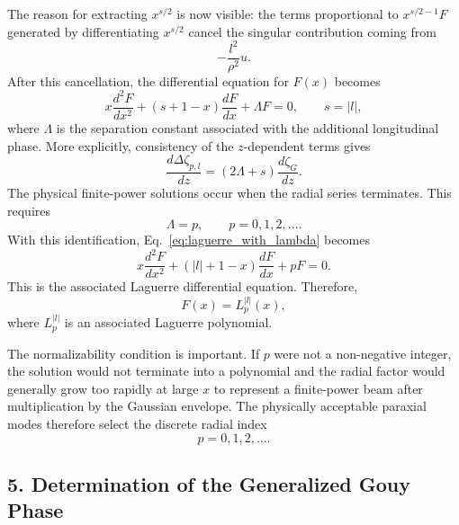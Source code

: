 \begin{resolucao}[Solution]
    The reason for extracting $x^{s/2}$ is now visible: the terms proportional to $x^{s/2-1}F$ generated by differentiating $x^{s/2}$ cancel the singular contribution coming from
    \[
        -\frac{l^2}{\rho^2}u.
    \]
    After this cancellation, the differential equation for $F(x)$ becomes
    \begin{equation}
        x\frac{d^2F}{dx^2}
        +
        (s+1-x)
        \frac{dF}{dx}
        +
        \Lambda F
        =
        0,
        \qquad
        s=|l|,
        \label{eq:laguerre_with_lambda}
    \end{equation}
    where $\Lambda$ is the separation constant associated with the additional longitudinal phase. More explicitly, consistency of the $z$-dependent terms gives
    \begin{equation}
        \frac{d\Delta\zeta_{p,l}}{dz}
        =
        (2\Lambda+s)
        \frac{d\zeta_G}{dz}.
        \label{eq:extra_gouy_relation_lambda}
    \end{equation}
    The physical finite-power solutions occur when the radial series terminates. This requires
    \begin{equation}
        \Lambda=p,
        \qquad
        p=0,1,2,\ldots.
        \label{eq:p_integer_condition}
    \end{equation}
    With this identification, Eq.~\eqref{eq:laguerre_with_lambda} becomes
    \begin{equation}
        \boxed{
        x\frac{d^2F}{dx^2}
        +
        (|l|+1-x)
        \frac{dF}{dx}
        +
        pF
        =
        0
        }.
        \label{eq:associated_laguerre_final}
    \end{equation}
    This is the associated Laguerre differential equation. Therefore,
    \begin{equation}
        F(x)
        =
        L_p^{|l|}(x),
        \label{eq:laguerre_solution}
    \end{equation}
    where $L_p^{|l|}$ is an associated Laguerre polynomial.

    The normalizability condition is important. If $p$ were not a non-negative integer, the solution would not terminate into a polynomial and the radial factor would generally grow too rapidly at large $x$ to represent a finite-power beam after multiplication by the Gaussian envelope. The physically acceptable paraxial modes therefore select the discrete radial index
    \[
        p=0,1,2,\ldots.
    \]

\subsection*{5. Determination of the Generalized Gouy Phase}


\end{resolucao}

